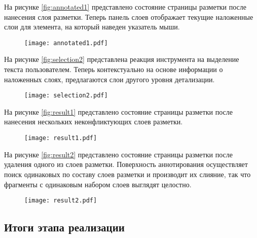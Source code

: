 \documentclass[../main]{subfiles}
\begin{document}
На рисунке \ref{fig:annotated1} представлено состояние страницы разметки после нанесения слоя разметки. Теперь панель слоев отображает текущие наложенные слои для элемента, на который наведен указатель мыши.
\begin{figure}[H]
    \centering
    {\texttt{[image: annotated1.pdf]}}
    \vspace{-\baselineskip}
\end{figure}

На рисунке \ref{fig:selection2} представлена реакция инструмента на выделение текста пользователем. Теперь контекстуально на основе информации о наложенных слоях, предлагаются слои другого уровня детализации.
\begin{figure}[H]
    \centering
    {\texttt{[image: selection2.pdf]}}
    \vspace{-\baselineskip}
\end{figure}

На рисунке \ref{fig:result1} представлено состояние страницы разметки после нанесения нескольких неконфликтующих слоев разметки.
\begin{figure}[H]
    \centering
    {\texttt{[image: result1.pdf]}}
    \vspace{-\baselineskip}
\end{figure}

На рисунке \ref{fig:result2} представлено состояние страницы разметки после удаления одного из слоев разметки. Поверхность аннотирования осуществляет поиск одинаковых по составу слоев разметки и производит их слияние, так что фрагменты с одинаковым набором слоев выглядят целостно.
\begin{figure}[H]
    \centering
    {\texttt{[image: result2.pdf]}}
    \vspace{-\baselineskip}
\end{figure}

\subsection{Итоги этапа реализации}
\end{document}
